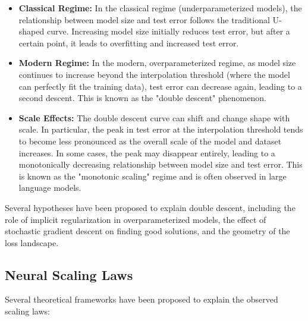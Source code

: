 \begin{itemize}[noitemsep]
    \item \textbf{Classical Regime:}  In the classical regime (underparameterized models), the relationship between model size and test error follows the traditional U-shaped curve. Increasing model size initially reduces test error, but after a certain point, it leads to overfitting and increased test error.
    \item \textbf{Modern Regime:}  In the modern, overparameterized regime, as model size continues to increase beyond the interpolation threshold (where the model can perfectly fit the training data), test error can decrease again, leading to a second descent. This is known as the "double descent" phenomenon.
    \item \textbf{Scale Effects:}  The double descent curve can shift and change shape with scale. In particular, the peak in test error at the interpolation threshold tends to become less pronounced as the overall scale of the model and dataset increases. In some cases, the peak may disappear entirely, leading to a monotonically decreasing relationship between model size and test error. This is known as the "monotonic scaling" regime and is often observed in large language models.
\end{itemize}

Several hypotheses have been proposed to explain double descent, including the role of implicit regularization in overparameterized models, the effect of stochastic gradient descent on finding good solutions, and the geometry of the loss landscape.

\subsection{Neural Scaling Laws}
\noindent
Several theoretical frameworks have been proposed to explain the observed scaling laws:

